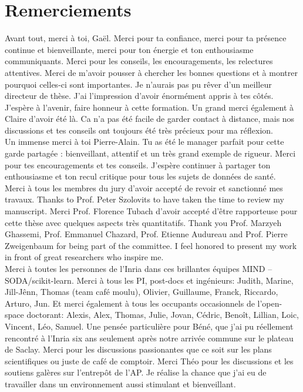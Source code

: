 \documentclass[french,12pt,twoside,a4paper]{book}
\begin{document}
\newpage
\chapter*{Remerciements}

Avant tout, merci à toi, Gaël. Merci pour ta confiance, merci pour ta présence
continue et bienveillante, merci pour ton énergie et ton enthousiasme
communiquants. Merci pour les conseils, les encouragements, les relectures
attentives. Merci de m'avoir pousser à chercher les bonnes questions et à
montrer pourquoi celles-ci sont importantes. Je n'aurais pas pu rêver d'un
meilleur directeur de thèse. J'ai l'impression d'avoir énormément appris à tes
côtés. J'espère à l'avenir, faire honneur à cette formation. Un grand merci
également à Claire d'avoir été là. Ca n'a pas été facile de garder contact à
distance, mais nos discussions et tes conseils ont toujours été très précieux
pour ma réflexion.\\

% 
Un immense merci à toi Pierre-Alain. Tu as été le manager parfait pour cette
garde partagée :  bienveillant, attentif et un très grand exemple de
rigueur. Merci pour tes encouragements et tes conseils. J'espère continuer à
partager ton enthousiasme et ton recul critique pour tous les sujets de données
de santé.\\

Merci à tous les membres du jury d'avoir accepté de revoir et sanctionné mes
travaux. Thanks to Prof. Peter Szolovits to have taken the time to review my
manuscript. Merci Prof. Florence Tubach d'avoir accepté d'être rapporteuse pour
cette thèse avec quelques aspects très quantitatifs. Thank you Prof. Marzyeh
Ghassemi, Prof. Emmanuel Chazard, Prof. Etienne Audureau and Prof. Pierre
Zweigenbaum for being part of the committee. I feel honored to present my work
in front of great researchers who inspire me.\\

Merci à toutes les personnes de l'Inria dans ces brillantes équipes
MIND -- SODA/scikit-learn. Merci à tous les PI, post-docs et ingénieurs: Judith, Marine,
Jill-Jênn, Thomas (team café moulu), Olivier, Guillaume, Franck, Riccardo, Arturo, Jun.
Et merci également à tous les occupants occasionnels de l'open-space doctorant:
Alexis, Alex, Thomas, Julie, Jovan, Cédric, Benoît, Lillian, Loic, Vincent, Léo, Samuel. Une
pensée particulière pour Béné, que j'ai pu réellement rencontré à l'Inria six
ans seulement après notre arrivée commune sur le plateau de Saclay. Merci pour les
discussions passionantes que ce soit sur les plans scientifiques ou juste de
café de comptoir. Merci Théo pour les discussions et les soutiens galères sur
l'entrepôt de l'AP. Je réalise la chance que j'ai eu de travailler dans un
environnement aussi stimulant et bienveillant.\\
\end{document}

